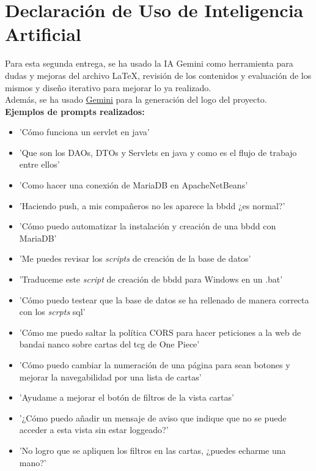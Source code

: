 \documentclass[10pt]{article}
\begin{document}
	\section{Declaración de Uso de Inteligencia Artificial}
	Para esta segunda entrega, se ha usado la IA Gemini como herramienta para dudas y mejoras del archivo LaTeX, revisión de los contenidos y evaluación de los mismos y diseño iterativo para mejorar lo ya realizado.\\
	Además, se ha usado \href{https://gemini.google.com/share/7a923a0bfae8}{Gemini} para la generación del logo del proyecto.\\
	\textbf{Ejemplos de prompts realizados:}
	\begin{itemize}
		\item 'Cómo funciona un servlet en java'
		\item 'Que son los DAOs, DTOs y Servlets en java y como es el flujo de trabajo entre ellos'
		\item 'Como hacer una conexión de MariaDB en ApacheNetBeans'
		\item 'Haciendo push, a mis compañeros no les aparece la bbdd ¿es normal?'
		\item 'Cómo puedo automatizar la instalación y creación de una bbdd con MariaDB'
		\item 'Me puedes revisar los \textit{scripts} de creación de la base de datos'
		\item 'Traduceme este \textit{script} de creación de bbdd para Windows en un .bat'
		\item 'Cómo puedo testear que la base de datos se ha rellenado de manera correcta con los \textit{scrpts} sql'
		\item 'Cómo me puedo saltar la política CORS para hacer peticiones a la web de bandai nanco sobre cartas del tcg de One Piece'
		\item 'Cómo puedo cambiar la numeración de una página para sean botones y mejorar la navegabilidad por una lista de cartas'
        \item 'Ayudame a mejorar el botón de filtros de la vista cartas'
        \item '¿Cómo puedo añadir un mensaje de aviso que indique que no se puede acceder a esta vista sin estar loggeado?'
        \item 'No logro que se apliquen los filtros en las cartas, ¿puedes echarme una mano?'
	\end{itemize}
	
	
\end{document}
